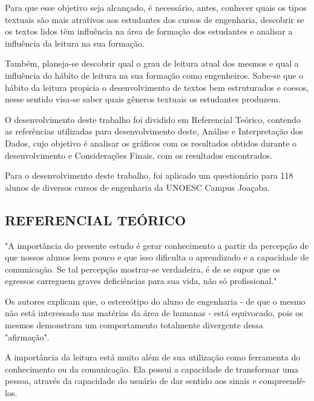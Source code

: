 \documentclass[
	article,			%
	11pt,				%
	oneside,			%
	a4paper,			%
	english,			%
	brazil,				%
	sumario=tradicional
	]{abntex2}
\begin{document}
Para que esse objetivo seja alcançado, é necessário, antes, conhecer quais os tipos textuais são mais atrativos aos estudantes dos cursos de engenharia, descobrir se os textos lidos têm influência na área de formação dos estudantes e analisar a influência da leitura na sua formação.

Também, planeja-se descobrir qual o grau de leitura atual dos mesmos e qual a influência do hábito de leitura na sua formação como engenheiros. Sabe-se que o hábito da leitura propicia o desenvolvimento de textos bem estruturados e coesos, nesse sentido visa-se saber quais gêneros textuais os estudantes produzem.

O desenvolvimento deste trabalho foi dividido em Referencial Teórico, contendo as referências utilizadas para desenvolvimento deste, Análise e Interpretação dos Dados, cujo objetivo é analisar os gráficos com os resultados obtidos durante o desenvolvimento e Considerações Finais, com os resultados encontrados.

Para o desenvolvimento deste trabalho, foi aplicado um questionário para 118 alunos de diversos cursos de engenharia da UNOESC Campus Joaçaba. 



\subsection{REFERENCIAL TEÓRICO}
"A importância do presente estudo é gerar conhecimento a partir da percepção de que nossos alunos leem pouco e que isso dificulta o aprendizado e a capacidade de comunicação. Se tal percepção mostrar-se verdadeira, é de se supor que os egressos carreguem graves deficiências para sua vida, não só profissional." \cite[p.9.132]{habitosleit}

Os autores  explicam que, o estereótipo do aluno de engenharia - de que o mesmo não está interessado nas matérias da área de humanas - está equivocado, pois os mesmos demonstram um comportamento totalmente divergente dessa "afirmação".

A importância da leitura está muito além de sua utilização como ferramenta do conhecimento ou da comunicação. Ela possui a capacidade de transformar uma pessoa, através da capacidade do usuário de dar sentido aos sinais e compreendê-los.
\end{document}
